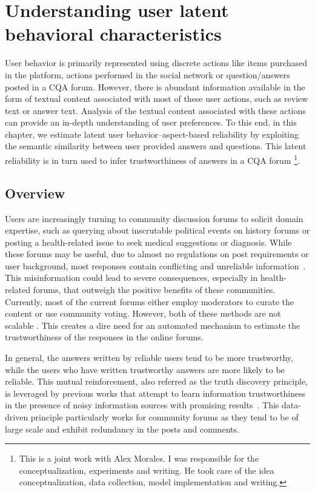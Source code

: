 \chapter{Understanding user latent behavioral characteristics}

\label{chap:reliability}
User behavior is primarily represented using discrete actions like items purchased in the platform, actions performed in the social network or question/answers posted in a CQA forum. However, there is abundant information available in the form of textual content associated with most of these user actions, such as review text or answer text. Analysis of the textual content associated with these actions can provide an in-depth understanding of user preferences.
To this end, in this chapter, we estimate latent user behavior--aspect-based reliability by exploiting the semantic similarity between user provided answers and questions. This latent reliability is in turn used to infer trustworthiness of answers in a CQA forum
\cite{crowdqm} \footnote{This is a joint work with Alex Morales. I was responsible for the conceptualization, experiments and writing. He took care of the idea conceptualization, data collection, model implementation and writing.}.
\section{Overview}
\label{crowdsec:intro}

Users are increasingly turning to community discussion forums to solicit domain expertise, such as querying about inscrutable political events on history forums or posting a health-related issue to seek medical suggestions or diagnosis.
While these forums may be useful, due to almost no regulations on post requirements or user background, most responses contain conflicting and unreliable information~\cite{li2017crowdsourced}. This misinformation could lead to severe consequences, especially in health-related forums, that outweigh the positive benefits of these communities. Currently, most of the current forums either employ moderators to curate the content or use community voting. However, both of these methods are not scalable \cite{gilbert2013widespread}. This creates a dire need for an automated mechanism to estimate the trustworthiness of the responses in the online forums.

In general, the answers written by reliable users tend to be more trustworthy, while the users who have written trustworthy answers are more likely to be reliable. This mutual reinforcement, also referred as the truth discovery principle, is leveraged by previous works that attempt to learn information trustworthiness in the presence of noisy information sources with promising results~\cite{Zhao:2012,Yin:2007,Galland:2010,Dong:2009}. This data-driven principle particularly works for community forums as they tend to be of large scale and exhibit redundancy in the posts and comments.

